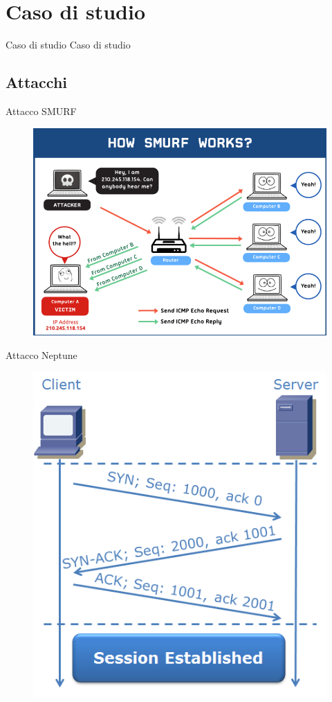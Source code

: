 \documentclass[utf8, a4paper]{beamer}
\begin{document}
\section{Caso di studio}
	\begin{frame}{Caso di studio}
		Caso di studio
	\end{frame}

	\subsection{Attacchi}
		\begin{frame}{Attacco SMURF}
			\begin{figure}
				\begin{center}
					\includegraphics[width=.75\textwidth]{smurf}
				\end{center}
			\end{figure}
		\end{frame}
		\begin{frame}{Attacco Neptune}
			\begin{figure}
				\begin{center}
					\includegraphics[width=.5\textwidth]{3wayh}
				\end{center}
			\end{figure}
		\end{frame}
		
\end{document}
